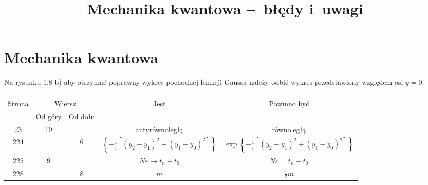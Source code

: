 \documentclass[a4paper,11pt]{article}
\title{Mechanika kwantowa --~błędy i~uwagi}
\begin{document}





\maketitle %





\section{Mechanika kwantowa}

\vspace{\spaceTwo}







\start {} Na rysunku 1.8 b) aby otrzymać poprawny wykres
pochodnej funkcji Gaussa należy odbić wykres przedstawiony względem osi
$y = 0$.

\vspace{\spaceFour}







\begin{center}

  \begin{tabular}{|c|c|c|c|c|}
    \hline
    & \multicolumn{2}{c|}{} & & \\
    Strona & \multicolumn{2}{c|}{Wiersz} & Jest
                              & Powinno być \\ \cline{2-3}
    & Od góry & Od dołu & & \\
    \hline
    23 & 19 & & antyrównoległą & równoległą \\
    224 & & 6 & $\left\{ -\frac{ 1 }{ i } [ ( y_{ 2  } - y_{ 1 } )^{ 2 }
                + ( y_{ 1 } - y_{ 0 } )^{ 2 } ] \right\}$
           & $\exp\left\{ -\frac{ 1 }{ i } [ ( y_{ 2  } - y_{ 1 } )^{ 2 }
             + ( y_{ 1 } - y_{ 0 } )^{ 2 } ] \right\}$ \\
    225 & 9 & & $N \varepsilon \to t_{ n } - t_{ 0 }$
           & $N \varepsilon = t_{ n } - t_{ 0 }$ \\
    228 & & 8 & $m$ & $\frac{ 1 }{ 2 } m$ \\
    \hline
  \end{tabular}

\end{center}
\end{document}
